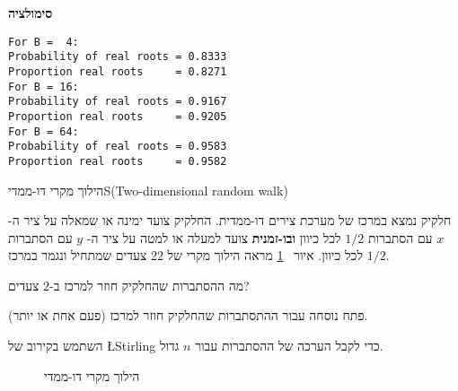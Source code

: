 \textbf{סימולציה}
\begin{verbatim}
For B =  4:
Probability of real roots = 0.8333
Proportion real roots     = 0.8271
For B = 16:
Probability of real roots = 0.9167
Proportion real roots     = 0.9205
For B = 64:
Probability of real roots = 0.9583
Proportion real roots     = 0.9582
\end{verbatim}


\begin{prob}{הילוך מקרי דו-ממדי}{S}{(Two-dimensional random walk)}

חלקיק נמצא במרכז של מערכת צירים דו-ממדית. החלקיק צועד ימינה או שמאלה על ציר ה-%
$x$
עם הסתברות 
$1/2$
לכל כיוון 
\textbf{ובו-זמנית}
צועד למעלה או למטה על ציר ה-%
$y$
עם הסתברות 
$1/2$
לכל כיוון. איור%
~\ref{f.2d-random-walk}
מראה הילוך מקרי של 
$22$
צעדים שמתחיל ונגמר במרכז.

מה ההסתברות שהחלקיק חוזר למרכז ב-$2$ צעדים?

פתח נוסחה עבור ההתסתברות שהחלקיק חוזר למרכז (פעם אחת או יותר).

השתמש בקירוב של
\L{Stirling}
כדי לקבל הערכה של ההסתברות עבור $n$ גדול.

\begin{figure}[t]
\begin{center}
\end{center}
\caption{הילוך מקרי דו-ממדי}\label{f.2d-random-walk}
\end{figure}
\end{prob}
\solution{}

